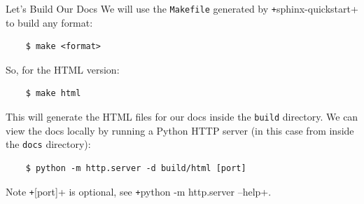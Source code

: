 \begin{frame}[fragile]{Let's Build Our Docs}
  We will use the \texttt{Makefile} generated by \texttt+sphinx-quickstart+ to build any format:
  \begin{verbatim}
    $ make <format>
  \end{verbatim}
  So, for the HTML version:
  \begin{verbatim}
    $ make html
  \end{verbatim}
  This will generate the HTML files for our docs inside the \texttt{build} directory.
  We can view the docs locally by running a Python HTTP server (in this case from inside the \texttt{docs} directory):
  \begin{verbatim}
    $ python -m http.server -d build/html [port]
  \end{verbatim}

  \begin{block}{Note}
    \texttt+[port]+ is optional, see \texttt+python -m http.server --help+.
  \end{block}
\end{frame}
